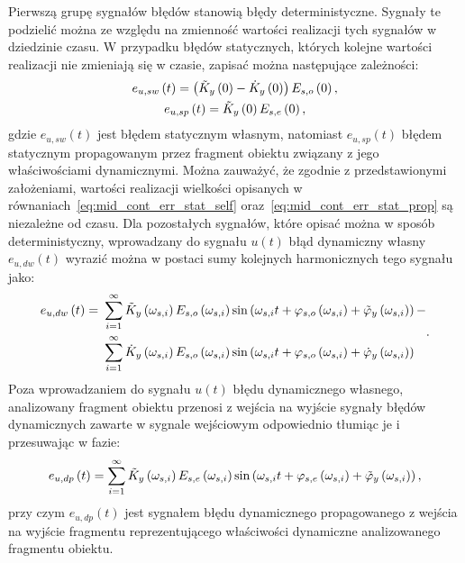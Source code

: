 Pierwszą grupę sygnałów błędów stanowią błędy deterministyczne. Sygnały te podzielić można ze względu na zmienność wartości realizacji tych sygnałów w dziedzinie czasu. W przypadku błędów statycznych, których kolejne wartości realizacji nie zmieniają się w czasie, zapisać można następujące zależności:
\begin{gather}
e_{u,sw} \left(t\right) = \left( \tilde{K}_{y} \left(0\right) - \dot{K}_{y} \left(0\right) \right) E_{s,o} \left(0\right) \label{eq:mid_cont_err_stat_self}, \\
e_{u,sp} \left(t\right) = \tilde{K}_{y} \left(0\right) E_{s,e} \left(0\right) \label{eq:mid_cont_err_stat_prop},
\end{gather}
gdzie $e_{u,sw}(t)$ jest błędem statycznym własnym, natomiast $e_{u,sp}(t)$ błędem statycznym propagowanym przez fragment obiektu związany z jego właściwościami dynamicznymi. Można zauważyć, że zgodnie z przedstawionymi założeniami, wartości realizacji wielkości opisanych w równaniach~\eqref{eq:mid_cont_err_stat_self} oraz~\eqref{eq:mid_cont_err_stat_prop} są niezależne od czasu. Dla pozostałych sygnałów, które opisać można w sposób deterministyczny, wprowadzany do sygnału $u(t)$ błąd dynamiczny własny $e_{u,dw}(t)$ wyrazić można w postaci sumy kolejnych harmonicznych tego sygnału jako:
\begin{equation}
\begin{split}
e_{u,dw} \left(t\right) =~
& \sum _{i = 1} ^{\infty} \tilde{K}_{y} \left(\omega_{s,i}\right) E_{s,o} \left(\omega_{s,i}\right) \sin \left( \omega_{s,i} t + \varphi_{s,o} \left(\omega_{s,i}\right) + \tilde{\varphi}_{y} \left(\omega_{s,i}\right) \right) - \\
& \sum _{i = 1} ^{\infty} \dot{K}_{y} \left(\omega_{s,i}\right) E_{s,o} \left(\omega_{s,i}\right) \sin \left( \omega_{s,i} t + \varphi_{s,o} \left(\omega_{s,i}\right) + \dot{\varphi}_{y} \left(\omega_{s,i}\right) \right)
\end{split}
\label{eq:mid_cont_err_dyn_self}.
\end{equation}
Poza wprowadzaniem do sygnału $u(t)$ błędu dynamicznego własnego, analizowany fragment obiektu przenosi z wejścia na wyjście sygnały błędów dynamicznych zawarte w sygnale wejściowym odpowiednio tłumiąc je i przesuwając w fazie:
\begin{equation}
e_{u,dp} \left(t\right) = \sum _{i = 1} ^{\infty} \tilde{K}_{y} \left(\omega_{s,i}\right) E_{s,e} \left(\omega_{s,i}\right) \sin \left( \omega_{s,i} t + \varphi_{s,e} \left(\omega_{s,i}\right) + \tilde{\varphi}_{y} \left(\omega_{s,i}\right) \right) \label{eq:mid_cont_err_dyn_prop},
\end{equation}
przy czym $e_{u,dp}(t)$ jest sygnałem błędu dynamicznego propagowanego z wejścia na wyjście fragmentu reprezentującego właściwości dynamiczne analizowanego fragmentu obiektu.

